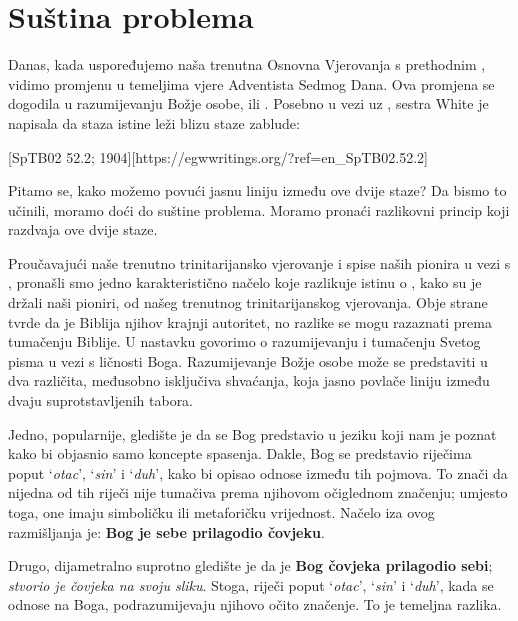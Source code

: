 \chapter{Suština problema}

Danas, kada uspoređujemo naša trenutna Osnovna Vjerovanja s prethodnim , vidimo promjenu u temeljima vjere Adventista Sedmog Dana. Ova promjena se dogodila u razumijevanju Božje osobe, ili . Posebno u vezi uz , sestra White je napisala da staza istine leži blizu staze zablude:

[SpTB02 52.2; 1904][https://egwwritings.org/?ref=en\_SpTB02.52.2]

Pitamo se, kako možemo povući jasnu liniju između ove dvije staze? Da bismo to učinili, moramo doći do suštine problema. Moramo pronaći razlikovni princip koji razdvaja ove dvije staze.

Proučavajući naše trenutno trinitarijansko vjerovanje i spise naših pionira u vezi s , pronašli smo jedno karakteristično načelo koje razlikuje istinu o , kako su je držali naši pioniri, od našeg trenutnog trinitarijanskog vjerovanja. Obje strane tvrde da je Biblija njihov krajnji autoritet, no razlike se mogu razaznati prema tumačenju Biblije. U nastavku govorimo o razumijevanju i tumačenju Svetog pisma u vezi s ličnosti Boga. Razumijevanje Božje osobe može se predstaviti u dva različita, međusobno isključiva shvaćanja, koja jasno povlače liniju između dvaju suprotstavljenih tabora.

Jedno, popularnije, gledište je da se Bog predstavio u jeziku koji nam je poznat kako bi objasnio samo koncepte spasenja. Dakle, Bog se predstavio riječima poput ‘\textit{otac}’, ‘\textit{sin}’ i ‘\textit{duh}’, kako bi opisao odnose između tih pojmova. To znači da nijedna od tih riječi nije tumačiva prema njihovom očiglednom značenju; umjesto toga, one imaju simboličku ili metaforičku vrijednost. Načelo iza ovog razmišljanja je: \textbf{Bog je sebe prilagodio čovjeku}.

Drugo, dijametralno suprotno gledište je da je \textbf{Bog čovjeka prilagodio sebi}; \textit{stvorio je čovjeka na svoju sliku}. Stoga, riječi poput ‘\textit{otac}’, ‘\textit{sin}’ i ‘\textit{duh}’, kada se odnose na Boga, podrazumijevaju njihovo očito značenje. To je temeljna razlika.

